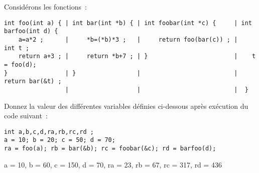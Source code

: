 Consid\'erons les fonctions~:
\begin{verbatim}
int foo(int a) { | int bar(int *b) { | int foobar(int *c) {     | int barfoo(int d) {   
    a=a*2 ;      |     *b=(*b)*3 ;   |     return foo(bar(c)) ; |    int t ;            
    return a+3 ; |     return *b+7 ; | }                        |    t = foo(d);        
}                | }                 |                          |    return bar(&t) ;   
                 |                   |                          |  }                     
\end{verbatim}
   Donnez la valeur des diff\'erentes variables d\'efinies ci-dessous
   apr\`es ex\'ecution du code suivant~:
\begin{verbatim}
int a,b,c,d,ra,rb,rc,rd ;
a = 10; b = 20; c = 50; d = 70;
ra = foo(a); rb = bar(&b); rc = foobar(&c); rd = barfoo(d);
\end{verbatim}
\ifcorrection
\begin{correction}
   a = 10, b = 60, c = 150, d = 70, ra = 23, rb = 67, rc = 317, rd = 436 
\end{correction}
\fi